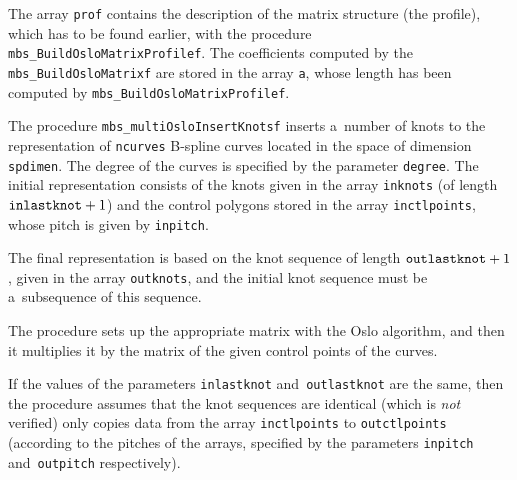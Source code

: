 The array \texttt{prof} contains the description of the matrix structure (the
profile), which has to be found earlier, with the procedure
\texttt{mbs\_BuildOsloMatrixProfilef}. The coefficients
computed by the \texttt{mbs\_BuildOsloMatrixf} are stored in the
array \texttt{a}, whose length has been computed by
\texttt{mbs\_BuildOsloMatrixProfilef}.

\vspace{\bigskipamount}
\begin{sloppypar}
The procedure \texttt{mbs\_multiOsloInsertKnotsf} inserts a~number of knots
to the representation of \texttt{ncurves} B-spline curves located in the space
of dimension \texttt{spdimen}.
The degree of the curves is specified by the parameter \texttt{degree}.
The initial representation consists of the knots given in the array
\texttt{inknots} (of length $\mathord{\mbox{\texttt{inlastknot}}}+1$)
and the control polygons stored in the array \texttt{inctlpoints},
whose pitch is given by \texttt{inpitch}.

The final representation is based on the knot sequence of length
$\mathord{\mbox{\texttt{outlastknot}}}+1$, given in the array
\texttt{outknots}, and the initial knot sequence must be a~subsequence of
this sequence.
\end{sloppypar}

The procedure sets up the appropriate matrix with the Oslo algorithm,
and then it multiplies it by the matrix of the given control points
of the curves.

If the values of the parameters \texttt{inlastknot} and~\texttt{outlastknot}
are the same, then the procedure assumes that the knot sequences are
identical (which is \emph{not} verified) only copies data from the array
\texttt{inctlpoints} to \texttt{outctlpoints} (according to the pitches
of the arrays, specified by the parameters \texttt{inpitch}
and~\texttt{outpitch} respectively).

